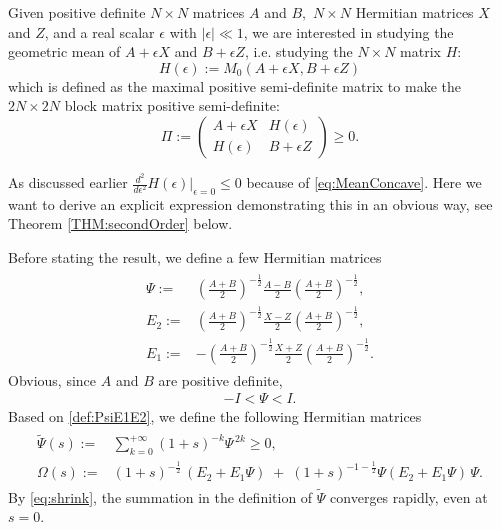 \documentclass{article}
\numberwithin{equation}{section}
\begin{document}
Given positive definite $N\times N$ matrices $A$ and $B,$ $N\times N$ Hermitian matrices $X$ and $Z$, and a real scalar $\epsilon$ with $|\epsilon|\ll 1$, we are interested in studying the geometric mean of $A+\epsilon X$ and $B+\epsilon Z$, i.e. studying the $N\times N$ matrix $H$:
\begin{equation}\label{def:GeoMean}
  H(\epsilon):=M_{0}(A+\epsilon X, B+ \epsilon Z)
\end{equation} which is defined as the maximal positive semi-definite matrix to make the
$2N\times 2N$ block matrix positive semi-definite:
\begin{equation}\label{def:Pi}
\Pi:=\begin{pmatrix}
A+\epsilon X & H(\epsilon) \\
H(\epsilon) & B+ \epsilon Z
\end{pmatrix}\geq 0.
\end{equation}

As discussed earlier
$
  \frac{d^2}{d\epsilon^2}H(\epsilon)\Big|_{\epsilon=0}\leq 0$ because of \eqref{eq:MeanConcave}. Here we want to derive an explicit expression demonstrating this in an obvious way, see Theorem \ref{THM:secondOrder} below.

Before stating the result, we define a few Hermitian matrices
\begin{align}\label{def:PsiE1E2}
\begin{split}
\Psi :=& \left( \frac{A+B}{2} \right)^{-\frac{1}{2}} \frac{A-B}{2} \left( \frac{A+B}{2} \right)^{-\frac{1}{2}},\\
E_2 :=& \left( \frac{A+B}{2} \right)^{-\frac{1}{2}} \frac{ X-  Z}{2} \left( \frac{A+B}{2} \right)^{-\frac{1}{2}},\\
E_1:=&-\left( \frac{A+B}{2} \right)^{-\frac{1}{2}} \frac{ X+  Z}{2} \left( \frac{A+B}{2} \right)^{-\frac{1}{2}}.
\end{split}
\end{align} Obvious, since $A$ and $B$ are positive definite,
\begin{align}\label{eq:shrink}
  -I<\Psi<I.
\end{align}
Based on \eqref{def:PsiE1E2}, we define the following Hermitian matrices
\begin{align}\label{def:PsiOmega}
\begin{split}
\widetilde{\Psi}(s):=&\sum_{k = 0}^{+\infty} 
(1+s)^{-k} \Psi^{\,2k}\geq 0,\\    
\Omega(s) := &
(1+s)^{-\frac{1}{2}}\, (E_2 + E_1 \Psi)
\;+\;
(1+s)^{-1 -\frac{1}{2}}
\Psi (E_2 + E_1 \Psi)\,\Psi .
\end{split}
\end{align} By \eqref{eq:shrink}, the summation in the definition of $\widetilde{\Psi}$ converges rapidly, even at $s=0.$ 
\end{document}
